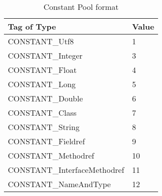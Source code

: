 ﻿\begin{table}
\centering
\begin{tabular}{l|l}
Tag of Type & Value \\
\hline\hline
CONSTANT\_Utf8 & 1 \\
CONSTANT\_Integer & 3 \\
CONSTANT\_Float & 4 \\
CONSTANT\_Long & 5 \\
CONSTANT\_Double & 6 \\
CONSTANT\_Class & 7 \\
CONSTANT\_String & 8 \\
CONSTANT\_Fieldref & 9 \\
CONSTANT\_Methodref & 10 \\
CONSTANT\_InterfaceMethodref & 11 \\
CONSTANT\_NameAndType & 12 \\
\hline
\end{tabular}
\caption{Constant Pool format}\label{tab:constantpooltype}
\end{table}
